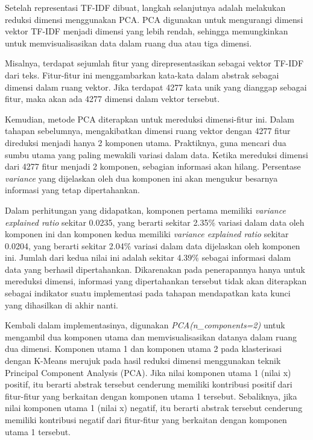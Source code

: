 Setelah representasi TF-IDF dibuat, langkah selanjutnya adalah melakukan reduksi dimensi menggunakan PCA. PCA digunakan untuk mengurangi dimensi vektor TF-IDF menjadi dimensi yang lebih rendah, sehingga memungkinkan untuk memvisualisasikan data dalam ruang dua atau tiga dimensi. 

Misalnya, terdapat sejumlah fitur yang direpresentasikan sebagai vektor TF-IDF dari teks. Fitur-fitur ini menggambarkan kata-kata dalam abstrak sebagai dimensi dalam ruang vektor. Jika terdapat 4277 kata unik yang dianggap sebagai fitur, maka akan ada 4277 dimensi dalam vektor tersebut.

Kemudian, metode PCA diterapkan untuk mereduksi dimensi-fitur ini. Dalam tahapan sebelumnya, mengakibatkan dimensi ruang vektor dengan 4277 fitur direduksi menjadi hanya 2 komponen utama. Praktiknya, guna mencari dua sumbu utama yang paling mewakili variasi dalam data. Ketika mereduksi dimensi dari 4277 fitur menjadi 2 komponen, sebagian informasi akan hilang. Persentase \textit{variance} yang dijelaskan oleh dua komponen ini akan mengukur besarnya informasi yang tetap dipertahankan. 

Dalam perhitungan yang didapatkan, komponen pertama memiliki \textit{variance explained ratio} sekitar 0.0235, yang berarti sekitar 2.35\% variasi dalam data oleh komponen ini dan komponen kedua memiliki \textit{variance explained ratio} sekitar 0.0204, yang berarti sekitar 2.04\% variasi dalam data dijelaskan oleh komponen ini. Jumlah dari kedua nilai ini adalah sekitar 4.39\% sebagai informasi dalam data yang berhasil dipertahankan. Dikarenakan pada penerapannya hanya untuk mereduksi dimensi, informasi yang dipertahankan tersebut tidak akan diterapkan sebagai indikator suatu implementasi pada tahapan mendapatkan kata kunci yang dihasilkan di akhir nanti. 

Kembali dalam implementasinya, digunakan \textit{PCA(n\_components=2)} untuk mengambil dua komponen utama dan memvisualisasikan datanya dalam ruang dua dimensi. Komponen utama 1 dan komponen utama 2 pada klasterisasi dengan K-Means merujuk pada hasil reduksi dimensi menggunakan teknik Principal Component Analysis (PCA). Jika nilai komponen utama 1 (nilai x) positif, itu berarti abstrak tersebut cenderung memiliki kontribusi positif dari fitur-fitur yang berkaitan dengan komponen utama 1 tersebut. Sebaliknya, jika nilai komponen utama 1 (nilai x) negatif, itu berarti abstrak tersebut cenderung memiliki kontribusi negatif dari fitur-fitur yang berkaitan dengan komponen utama 1 tersebut.

